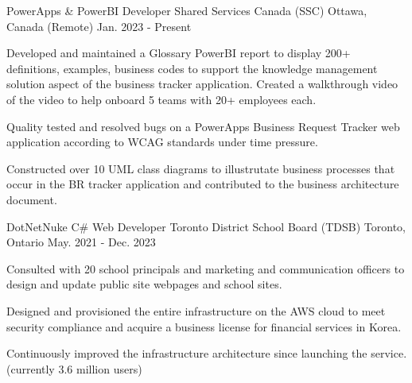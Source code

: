 

\begin{cventries}

  \cventry
    {PowerApps & PowerBI Developer} %
    {Shared Services Canada (SSC)} %
    {Ottawa, Canada (Remote)} %
    {Jan. 2023 - Present} %
    {
      \begin{cvitems} %
        \item {Developed and maintained a Glossary PowerBI report to display 200+ definitions, examples, business codes to support the knowledge management solution aspect of the business tracker application. Created a walkthrough video of the video to help onboard 5 teams with 20+ employees each. }
        \item {Quality tested and resolved bugs on a PowerApps Business Request Tracker web application according to WCAG standards under time pressure.  }
        \item {Constructed over 10\+ UML class diagrams to illustrutate business processes that occur in the BR tracker application and contributed to the business architecture document.}
      \end{cvitems}
    }

\cventry
    {DotNetNuke C\# Web Developer} %
    {Toronto District School Board (TDSB)} %
    {Toronto, Ontario} %
    {May. 2021 - Dec. 2023} %
    {
      \begin{cvitems} %
        \item {Consulted with 20\+ school principals and marketing and communication officers to design and update public site webpages and school sites.  }
        \item {Designed and provisioned the entire infrastructure on the AWS cloud to meet security compliance and acquire a business license for financial services in Korea.}
        \item {Continuously improved the infrastructure architecture since launching the service. (currently 3.6 million users)}
      \end{cvitems}
    }


\end{cventries}
